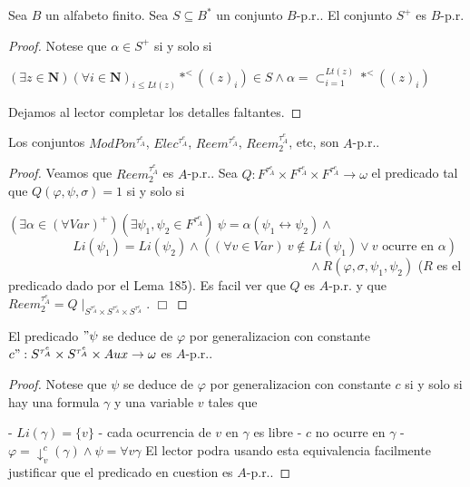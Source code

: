   \begin{lemma}
    Sea \(B\) un alfabeto finito. Sea \(S\subseteq B^{\ast }\) un conjunto \(B\)-p.r.. El conjunto \(S^{+}\) es \(B\)-p.r.
  \end{lemma}
  \begin{proof}
    Notese que \(\alpha \in S^{+}\) si y solo si

    \(\displaystyle (\exists z\in \mathbf{N})(\forall i\in \mathbf{N})_{i\leq Lt(z)}\ast ^{< }((z)_{i})\in S\wedge \alpha =\mathrm{\subset }_{i=1}^{Lt(z)}\ast ^{< }((z)_{i}) \)

    Dejamos al lector completar los detalles faltantes.
  \end{proof}

  \begin{lemma}
    Los conjuntos \(ModPon^{\tau _{A}^{e}}\), \(Elec^{\tau _{A}^{e}}\), \(Reem^{\tau _{A}^{e}}\), \(Reem_{2}^{\tau _{A}^{e}}\), etc, son \(A\)-p.r..
  \end{lemma}
  \begin{proof}
    Veamos que \(Reem_{2}^{\tau _{A}^{e}}\) es \(A\)-p.r.. Sea \(Q:F^{\tau _{A}^{e}}\times F^{\tau _{A}^{e}}\times F^{\tau _{A}^{e}}\rightarrow \omega \) el predicado tal que \(Q(\varphi ,\psi ,\sigma )=1\) si y solo si

    \((\exists \alpha \in (\forall Var)^{+})(\exists \psi _{1},\psi _{2}\in F^{\tau _{A}^{e}})\ \psi =\alpha (\psi _{1}\leftrightarrow \psi _{2})\wedge \)
    \(\ \ \ \ \ \ \ \ \ \ \ \ \ \ \ \ \ \ \ \ \ \ \ Li(\psi _{1})=Li(\psi _{2})\wedge \left( (\forall v\in Var)\ v\notin Li(\psi _{1})\vee v\text{ ocurre en }\alpha \right) \)
    \(\ \ \ \ \ \ \ \ \ \ \ \ \ \ \ \ \ \ \ \ \ \ \ \ \ \ \ \ \ \ \ \ \ \ \ \ \ \ \ \ \ \ \ \ \ \ \ \ \ \ \ \ \ \ \ \ \ \ \ \ \ \ \ \ \ \ \ \ \ \ \ \ \ \ \ \ \ \ \ \ \ \ \ \ \ \ \ \ \ \ \ \ \ \ \ \ \ \ \ \ \ \ \ \ \ \ \ \wedge R(\varphi ,\sigma ,\psi _{1},\psi _{2})\)
    (\(R\) es el predicado dado por el Lema 185). Es facil ver que \(Q\) es \(A\)-p.r. y que \(Reem_{2}^{\tau _{A}^{e}}=Q\mid _{S^{\tau _{A}^{e}}\times S^{\tau _{A}^{e}}\times S^{\tau _{A}^{e}}}\). \(\Box\)
  \end{proof}

  \begin{lemma}
    El predicado \("\psi \) se deduce de \(\varphi \) por generalizacion con constante \(c":S^{\tau _{A}^{e}}\times S^{\tau _{A}^{e}}\times Aux\rightarrow \omega \) es \(A\)-p.r..
  \end{lemma}
  \begin{proof}
    Notese que \(\psi \) se deduce de \(\varphi \) por generalizacion con constante \( c\) si y solo si hay una formula \(\gamma \) y una variable \(v\) tales que

    - \(Li(\gamma )=\{v\}\)
    - cada ocurrencia de \(v\) en \(\gamma \) es libre
    - \(c\) no ocurre en \(\gamma \)
    - \(\varphi =\mathrm{\downarrow }_{v}^{c}(\gamma )\wedge \psi =\forall v\gamma \)
    El lector podra usando esta equivalencia facilmente justificar que el predicado en cuestion es \(A\)-p.r..
  \end{proof}

